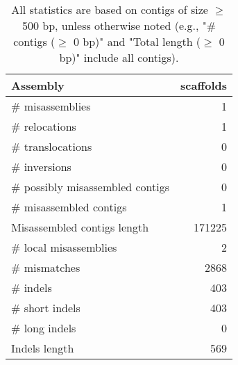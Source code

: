 \documentclass[12pt,a4paper]{article}
\begin{document}
\begin{table}[ht]
\begin{center}
\caption{All statistics are based on contigs of size $\geq$ 500 bp, unless otherwise noted (e.g., "\# contigs ($\geq$ 0 bp)" and "Total length ($\geq$ 0 bp)" include all contigs).}
\begin{tabular}{|l*{1}{|r}|}
\hline
Assembly & scaffolds \\ \hline
\# misassemblies & 1 \\ \hline
\hspace{5mm}\# relocations & 1 \\ \hline
\hspace{5mm}\# translocations & 0 \\ \hline
\hspace{5mm}\# inversions & 0 \\ \hline
\# possibly misassembled contigs & 0 \\ \hline
\# misassembled contigs & 1 \\ \hline
Misassembled contigs length & 171225 \\ \hline
\# local misassemblies & 2 \\ \hline
\# mismatches & 2868 \\ \hline
\# indels & 403 \\ \hline
\hspace{5mm}\# short indels & 403 \\ \hline
\hspace{5mm}\# long indels & 0 \\ \hline
Indels length & 569 \\ \hline
\end{tabular}
\end{center}
\end{table}
\end{document}
